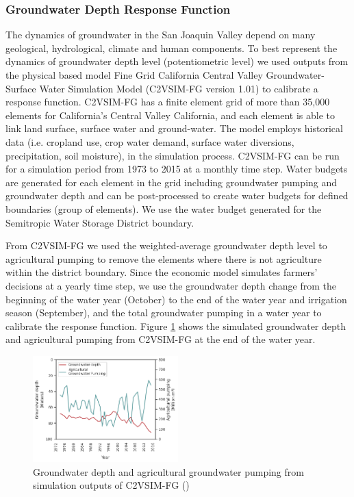 \documentclass[a4paper,fleqn]{cas-sc}
\begin{document}
\subsubsection{Groundwater Depth Response Function}

The dynamics of groundwater in the San Joaquin Valley depend on many geological, hydrological, climate and human components. To best represent the dynamics of groundwater depth level (potentiometric level) we used outputs from the physical based model Fine Grid California Central Valley Groundwater-Surface Water Simulation Model (C2VSIM-FG version 1.01) \citep{dwr_c2vsimfg_2021} to calibrate a response function. C2VSIM-FG has a finite element grid of more than 35,000 elements for California’s Central Valley California, and each element is able to link land surface, surface water and ground-water. The model employs historical data (i.e. cropland use, crop water demand, surface water diversions, precipitation, soil moisture), in the simulation process. C2VSIM-FG can be run for a simulation period from 1973 to 2015 at a monthly time step. Water budgets are generated for each element in the grid including groundwater pumping and groundwater depth and can be post-processed to create water budgets for defined boundaries (group of elements). We use the water budget generated for the Semitropic Water Storage District boundary. 

From C2VSIM-FG we used the weighted-average groundwater depth level to agricultural pumping to remove the elements where there is not agriculture within the district boundary. Since the economic model simulates farmers’ decisions at a yearly time step, we use the groundwater depth change from the beginning of the water year (October) to the end of the water year and irrigation season (September), and the total groundwater pumping in a water year to calibrate the response function. Figure \ref{fig:3} shows the simulated groundwater depth and agricultural pumping from C2VSIM-FG at the end of the water year. 

\begin{figure}[ht]
    \centering
    \includegraphics[width=0.5\textwidth]{c2vsim_semitropic.png}
    \caption{Groundwater depth and agricultural groundwater pumping from simulation outputs of C2VSIM-FG (\cite{dwr_c2vsimfg_2021})}
    \label{fig:3}
\end{figure}
\end{document}
